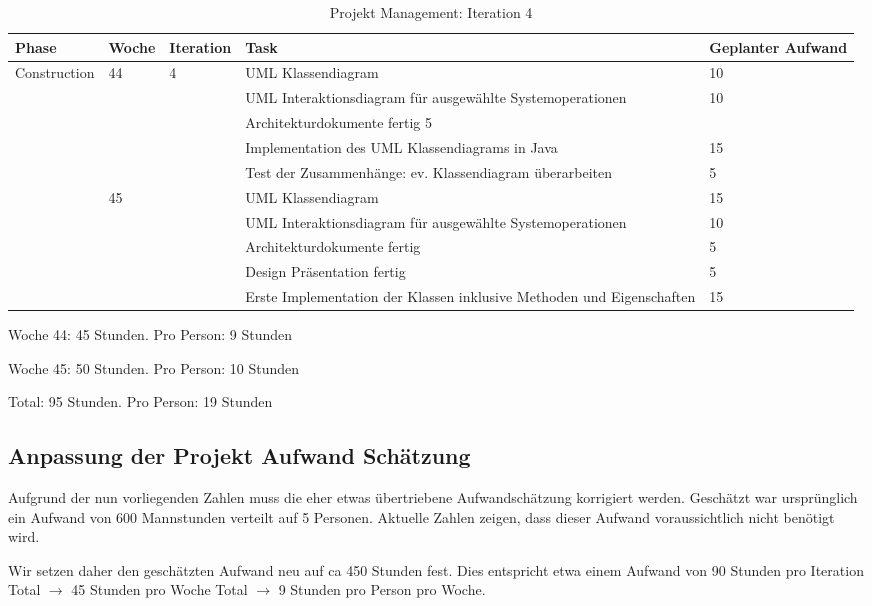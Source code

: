 \begin{table}[htp]
\begin{tabular}{ | l | l | l |  p{6.5cm} | l |}
\hline
Phase & Woche & Iteration & Task & Geplanter Aufwand \\ \hline
\hline
Construction & 44 &  4  & UML Klassendiagram & 10 \\ \hline
 &  &  & UML Interaktionsdiagram für ausgewählte Systemoperationen & 10 \\ \hline
 &  &  & Architekturdokumente fertig 5 \\ \hline
 &  &  & Implementation des UML Klassendiagrams in Java & 15 \\ \hline
 &  &  & Test der Zusammenhänge: ev. Klassendiagram überarbeiten & 5 \\ \hline \hline
 & 45 &  & UML Klassendiagram & 15 \\ \hline
 &  &  & UML Interaktionsdiagram für ausgewählte Systemoperationen & 10 \\ \hline
 &  &  & Architekturdokumente fertig & 5 \\ \hline
 &  &  & Design Präsentation fertig & 5 \\ \hline
 &  &  & Erste Implementation der Klassen inklusive Methoden und Eigenschaften &  15 \\ \hline
\end{tabular}
\caption{Projekt Management: Iteration 4}
\end{table}

Woche 44: 45 Stunden. Pro Person: 9 Stunden

Woche 45: 50 Stunden. Pro Person: 10 Stunden

Total: 95 Stunden. Pro Person: 19 Stunden

\subsection{Anpassung der Projekt Aufwand Schätzung} \label{sec:Anpassung-der-Projekt-Aufwand-Schaetzung}

Aufgrund der nun vorliegenden Zahlen muss die eher etwas übertriebene Aufwandschätzung korrigiert werden. Geschätzt war ursprünglich ein Aufwand von 600 Mannstunden verteilt auf 5 Personen. Aktuelle Zahlen zeigen, dass dieser Aufwand voraussichtlich nicht benötigt wird.

Wir setzen daher den geschätzten Aufwand neu auf ca 450 Stunden fest. Dies entspricht etwa einem Aufwand von 90 Stunden pro Iteration Total $\rightarrow$ 45 Stunden pro Woche Total $\rightarrow$ 9 Stunden pro Person pro Woche.

